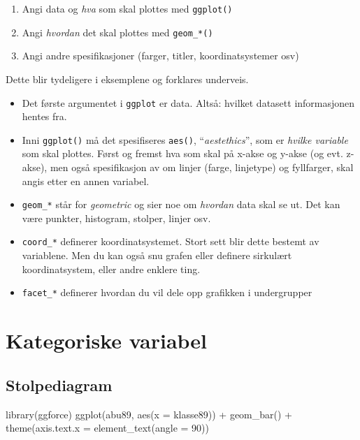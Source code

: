 \documentclass[
  norsk,
  letterpaper,
  DIV=11,
  numbers=noendperiod]{scrreprt}
\newenvironment{Shaded}{\begin{snugshade}}{\end{snugshade}}
\newcommand{\AttributeTok}[1]{\textcolor[rgb]{0.40,0.45,0.13}{#1}}
\newcommand{\DecValTok}[1]{\textcolor[rgb]{0.68,0.00,0.00}{#1}}
\newcommand{\FunctionTok}[1]{\textcolor[rgb]{0.28,0.35,0.67}{#1}}
\newcommand{\NormalTok}[1]{\textcolor[rgb]{0.00,0.23,0.31}{#1}}
\newcommand{\SpecialCharTok}[1]{\textcolor[rgb]{0.37,0.37,0.37}{#1}}
\providecommand{\tightlist}{%
  \setlength{\itemsep}{0pt}\setlength{\parskip}{0pt}}
\theoremstyle{definition}
\theoremstyle{remark}
\begin{document}
\begin{enumerate}
\def\labelenumi{\arabic{enumi})}
\tightlist
\item
  Angi data og \emph{hva} som skal plottes med \texttt{ggplot()}
\item
  Angi \emph{hvordan} det skal plottes med \texttt{geom\_*()}
\item
  Angi andre spesifikasjoner (farger, titler, koordinatsystemer osv)
\end{enumerate}

Dette blir tydeligere i eksemplene og forklares underveis.

\begin{itemize}
\tightlist
\item
  Det første argumentet i \texttt{ggplot} er data. Altså: hvilket
  datasett informasjonen hentes fra.
\item
  Inni \texttt{ggplot()} må det spesifiseres \texttt{aes()},
  ``\emph{aestethics}'', som er \emph{hvilke variable} som skal plottes.
  Først og fremst hva som skal på x-akse og y-akse (og evt. z-akse), men
  også spesifikasjon av om linjer (farge, linjetype) og fyllfarger, skal
  angis etter en annen variabel.
\item
  \texttt{geom\_*} står for \emph{geometric} og sier noe om
  \emph{hvordan} data skal se ut. Det kan være punkter, histogram,
  stolper, linjer osv.
\item
  \texttt{coord\_*} definerer koordinatsystemet. Stort sett blir dette
  bestemt av variablene. Men du kan også snu grafen eller definere
  sirkulært koordinatsystem, eller andre enklere ting.
\item
  \texttt{facet\_*} definerer hvordan du vil dele opp grafikken i
  undergrupper
\end{itemize}

\section{Kategoriske variabel}\label{kategoriske-variabel}

\subsection{Stolpediagram}\label{stolpediagram}

\begin{Shaded}
\begin{Highlighting}[]
\FunctionTok{library}\NormalTok{(ggforce)}
\FunctionTok{ggplot}\NormalTok{(abu89, }\FunctionTok{aes}\NormalTok{(}\AttributeTok{x =}\NormalTok{ klasse89)) }\SpecialCharTok{+}
  \FunctionTok{geom\_bar}\NormalTok{() }\SpecialCharTok{+}
  \FunctionTok{theme}\NormalTok{(}\AttributeTok{axis.text.x =} \FunctionTok{element\_text}\NormalTok{(}\AttributeTok{angle =} \DecValTok{90}\NormalTok{))}
\end{Highlighting}
\end{Shaded}
\end{document}
